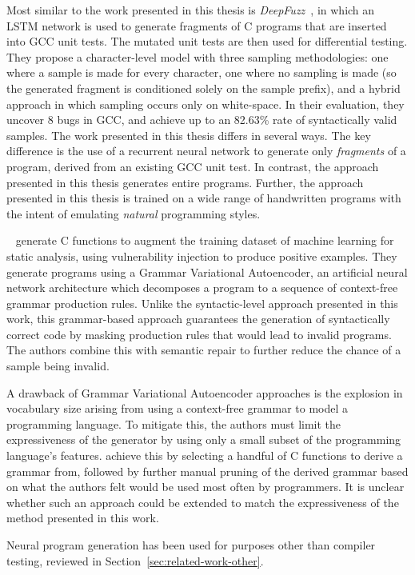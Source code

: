 Most similar to the work presented in this thesis is \emph{DeepFuzz}~\cite{Liu2019}, in which an LSTM network is used to generate fragments of C programs that are inserted into GCC unit tests. The mutated unit tests are then used for differential testing. They propose a character-level model with three sampling methodologies: one where a sample is made for every character, one where no sampling is made (so the generated fragment is conditioned solely on the sample prefix), and a hybrid approach in which sampling occurs only on white-space. In their evaluation, they uncover 8 bugs in GCC, and achieve up to an 82.63\% rate of syntactically valid samples. The work presented in this thesis differs in several ways. The key difference is the use of a recurrent neural network to generate only \emph{fragments} of a program, derived from an existing GCC unit test. In contrast, the approach presented in this thesis generates entire programs. Further, the approach presented in this thesis is trained on a wide range of handwritten programs with the intent of emulating \emph{natural} programming styles.

\citeauthor{Kosta2019}~\cite{Kosta2019} generate C functions to augment the training dataset of machine learning for static analysis, using vulnerability injection to produce positive examples. They generate programs using a Grammar Variational Autoencoder, an artificial neural network architecture which decomposes a program to a sequence of context-free grammar production rules. Unlike the syntactic-level approach presented in this work, this grammar-based approach guarantees the generation of syntactically correct code by masking production rules that would lead to invalid programs. The authors combine this with semantic repair to further reduce the chance of a sample being invalid.

A drawback of Grammar Variational Autoencoder approaches is the explosion in vocabulary size arising from using a context-free grammar to model a programming language. To mitigate this, the authors must limit the expressiveness of the generator by using only a small subset of the programming language's features. \citeauthor{Kosta2019} achieve this by selecting a handful of C functions to derive a grammar from, followed by further manual pruning of the derived grammar based on what the authors felt would be used most often by programmers. It is unclear whether such an approach could be extended to match the expressiveness of the method presented in this work.

Neural program generation has been used for purposes other than compiler testing, reviewed in Section~\ref{sec:related-work-other}.


